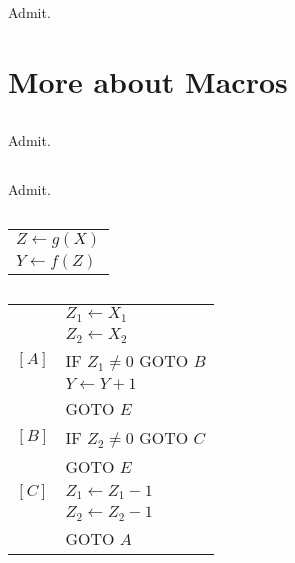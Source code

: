 \subsection{}
Admit.



\section{More about Macros}

\subsection{}
Admit.

\subsection{}
Admit.

\subsection{}
\begin{center}
\begin{tabular}{l}
  $ Z \gets g(X) $ \\
  $ Y \gets f(Z) $ \\
\end{tabular}
\end{center}


\subsection{}
\begin{center}
\begin{tabular}{ll}
        & $ Z_{1} \gets X_{1} $ \\
        & $ Z_{2} \gets X_{2} $ \\
  $[A]$ & IF $Z_{1} \neq 0$ GOTO $B$ \\
        & $ Y \gets Y + 1 $ \\
        & GOTO $E$ \\
  $[B]$ & IF $Z_{2} \neq 0$ GOTO $C$ \\
        & GOTO $E$ \\
  $[C]$ & $ Z_{1} \gets Z_{1} - 1 $ \\
        & $ Z_{2} \gets Z_{2} - 1 $ \\
        & GOTO $A$ \\
\end{tabular}
\end{center}


